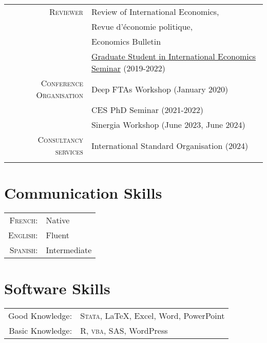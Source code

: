 \documentclass[a4paper,10pt]{article} %
\begin{document}
\begin{tabular}{r|p{11cm}}

\textsc{Reviewer} & Review of International Economics,  \\
\textsc{} & Revue d'économie politique, \\
& Economics Bulletin \\

& \href{https://sites.google.com/view/semgsie/accueil}{Graduate Student in International Economics Seminar} (2019-2022) \\
\textsc{Conference Organisation} & Deep FTAs Workshop (January 2020) \\
& CES PhD Seminar (2021-2022)\\
& Sinergia Workshop (June 2023, June 2024)\\
\textsc{Consultancy services} & International Standard Organisation (2024)  \\
\multicolumn{2}{c}{} \\


\end{tabular}

\section{\textcolor{bluegray}{Communication Skills}}

\begin{tabular}{rl}
\textsc{French:} & Native\\

\textsc{English:} & Fluent \\

\textsc{Spanish:} & Intermediate \\
\end{tabular}


\section{\textcolor{bluegray}{Software Skills}}

\begin{tabular}{rl}
Good Knowledge: & \textsc{Stata}, {\LaTeX}, Excel, Word, PowerPoint \\

Basic Knowledge: & R, \textsc{vba}, \textsc{SAS}, WordPress  \\
\end{tabular}
\end{document}
